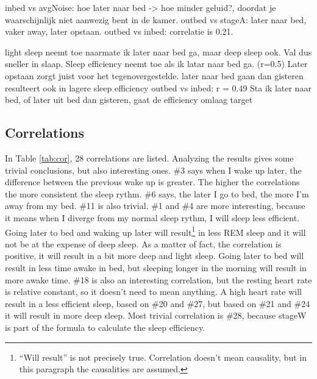 	inbed vs avgNoise: hoe later naar bed -> hoe minder geluid?, doordat je waarschijnlijk niet aanwezig bent in de kamer.
	outbed vs stageA: later naar bed, vaker away, later opstaan.
	outbed vs inbed: correlatie is 0.21. 

	light sleep neemt toe naarmate ik later naar bed ga, maar deep sleep ook. Val dus sneller in slaap. 
	Sleep efficiency neemt toe als ik latar naar bed ga. (r=0.5) Later opstaan zorgt juist voor het tegenovergestelde.
	later naar bed gaan dan gisteren resulteert ook in lagere sleep efficiency
	outbed vs inbed: r = 0.49
	Sta ik later naar bed, of later uit bed dan gisteren, gaat de efficiency omlaag 
	target

	\newpage
	\subsection{Correlations}
	In Table \ref{tab:cor}, 28 correlations are listed. Analyzing the results gives some trivial conclusions, but also interesting ones. \#3 says when I wake up later, the difference between the previous wake up is greater. The higher the correlations the more consistent the sleep rythm. \#6 says, the later I go to bed, the more I'm away from my bed. \#11 is also trivial. \#1 and \#4 are more interesting, because it means when I diverge from my normal sleep rythm, I will sleep less efficient. Going later to bed and waking up later will result\footnote{``Will result'' is not precisely true. Correlation doesn't mean causality, but in this paragraph the causalities are assumed.}  in less REM sleep and it will not be at the expense of deep sleep. As a matter of fact, the correlation is positive, it will result in a bit more deep and light sleep. Going later to bed will result in less time awake in bed, but sleeping longer in the morning will result in more awake time. \#18 is also an interesting correlation, but the resting heart rate is relative constant, so it doesn't need to mean anything. A high heart rate will result in a less efficient sleep, based on \#20 and \#27, but based on \#21 and \#24 it will result in more deep sleep. Most trivial correlation is \#28, because stageW is part of the formula to calculate the sleep efficiency.
		


